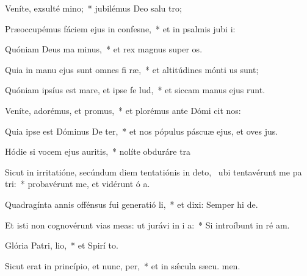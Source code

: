 \item Veníte, exsulté mino;~* jubilémus Deo salu tro;
\item Præoccupémus fáciem ejus in confesne,~* et in psalmis jubi i:
\item Quóniam Deus ma minus,~* et rex magnus super  os.
\item Quia in manu ejus sunt omnes fi ræ,~* et altitúdines mónti us sunt;
\item Quóniam ipsíus est mare, et ipse fe lud,~* et siccam manus ejus runt.
\item Veníte, adorémus, et promus,~* et plorémus ante Dómi  cit nos:
\item Quia ipse est Dóminus De ter,~* et nos pópulus páscuæ ejus, et oves  jus.
\item Hódie si vocem ejus auritis,~* nolíte obduráre  tra
\item Sicut in irritatióne, secúndum diem tentatiónis in deto,~\pscross{} ubi tentavérunt me pa tri:~* probavérunt me, et vidérunt ó a.
\item Quadragínta annis offénsus fui generatió li,~* et dixi: Semper hi  de.
\item Et isti non cognovérunt vias meas: ut jurávi in i a:~* Si introíbunt in ré am.
\item Glória Patri,  lio,~* et Spirí to.
\item Sicut erat in princípio, et nunc,  per,~* et in sǽcula sæcu. men.
